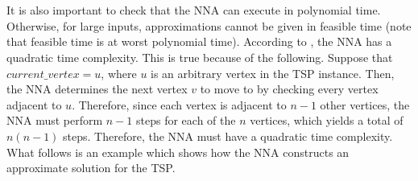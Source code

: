 \documentclass[12pt]{article}
\numberwithin{equation}{subsection}
\numberwithin{table}{subsection}
\numberwithin{algorithm}{subsection}
\begin{document}
\\\\It is also important to check that the NNA can execute in polynomial time. Otherwise, for large inputs, approximations cannot be given in feasible time (note that feasible time is at worst polynomial time). According to \cite{Rosenkrantz}, the NNA has a quadratic time complexity. This is true because of the following. Suppose that $current\_vertex = u$, where $u$ is an arbitrary vertex in the TSP instance. Then, the NNA determines the next vertex $v$ to move to by checking every vertex adjacent to $u$. Therefore, since each vertex is adjacent to $n-1$ other vertices, the NNA must perform $n-1$ steps for each of the $n$ vertices, which yields a total of $n(n-1)$ steps. Therefore, the NNA must have a quadratic time complexity. What follows is an example which shows how the NNA constructs an approximate solution for the TSP.
\end{document}
